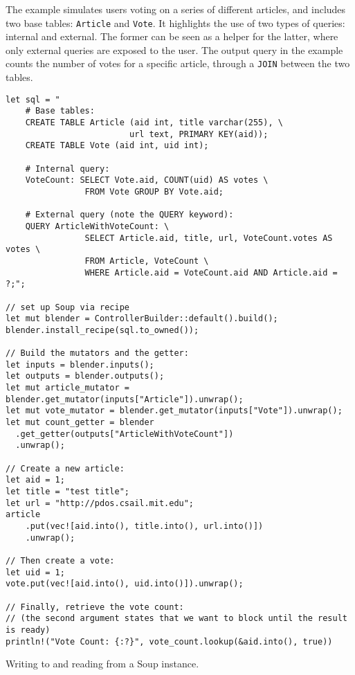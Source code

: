\documentclass[b5paper]{report}
\begin{document}
The example simulates users voting on a series of different articles, and
includes two base tables: \texttt{Article} and \texttt{Vote}. It highlights the
use of two types of queries: internal and external. The former can be seen as a
helper for the latter, where only external queries are exposed to the user. The
output query in the example counts the number of votes for a specific article,
through a \texttt{JOIN} between the two tables.

\begin{listing}[H]
  \vspace*{-1.1in}
  \begin{verbatim}
let sql = "
    # Base tables:
    CREATE TABLE Article (aid int, title varchar(255), \
                         url text, PRIMARY KEY(aid));
    CREATE TABLE Vote (aid int, uid int);

    # Internal query:
    VoteCount: SELECT Vote.aid, COUNT(uid) AS votes \
                FROM Vote GROUP BY Vote.aid;

    # External query (note the QUERY keyword):
    QUERY ArticleWithVoteCount: \
                SELECT Article.aid, title, url, VoteCount.votes AS votes \
                FROM Article, VoteCount \
                WHERE Article.aid = VoteCount.aid AND Article.aid = ?;";

// set up Soup via recipe
let mut blender = ControllerBuilder::default().build();
blender.install_recipe(sql.to_owned());

// Build the mutators and the getter:
let inputs = blender.inputs();
let outputs = blender.outputs();
let mut article_mutator = blender.get_mutator(inputs["Article"]).unwrap();
let mut vote_mutator = blender.get_mutator(inputs["Vote"]).unwrap();
let mut count_getter = blender
  .get_getter(outputs["ArticleWithVoteCount"])
  .unwrap();

// Create a new article:
let aid = 1;
let title = "test title";
let url = "http://pdos.csail.mit.edu";
article
    .put(vec![aid.into(), title.into(), url.into()])
    .unwrap();

// Then create a vote:
let uid = 1;
vote.put(vec![aid.into(), uid.into()]).unwrap();

// Finally, retrieve the vote count:
// (the second argument states that we want to block until the result is ready)
println!("Vote Count: {:?}", vote_count.lookup(&aid.into(), true))
  \end{verbatim}
  \caption{
    Writing to and reading from a Soup instance.
    \label{lst:soup-example}
  }
\end{listing}
\end{document}
